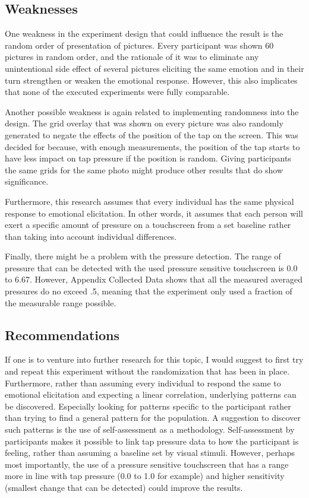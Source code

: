 \documentclass{sigchi}
\begin{document}
\subsection{Weaknesses}
One weakness in the experiment design that could influence the result is the random order of presentation of pictures. Every participant was shown 60 pictures in random order, and the rationale of it was to eliminate any unintentional side effect of several pictures eliciting the same emotion and in their turn strengthen or weaken the emotional response. However, this also implicates that none of the executed experiments were fully comparable.

Another possible weakness is again related to implementing randomness into the design. The grid overlay that was shown on every picture was also randomly generated to negate the effects of the position of the tap on the screen. This was decided for because, with enough measurements, the position of the tap starts to have less impact on tap pressure if the position is random. Giving participants the same grids for the same photo might produce other results that do show significance.

Furthermore, this research assumes that every individual has the same physical response to emotional elicitation. In other words, it assumes that each person will exert a specific amount of pressure on a touchscreen from a set baseline rather than taking into account individual differences.

Finally, there might be a problem with the pressure detection. The range of pressure that can be detected with the used pressure sensitive touchscreen is 0.0 to 6.67. However, Appendix Collected Data shows that all the measured averaged pressures do no exceed .5, meaning that the experiment only used a fraction of the measurable range possible.

\subsection{Recommendations} %
\label{sub:recommendations}
If one is to venture into further research for this topic, I would suggest to first try and repeat this experiment without the randomization that has been in place. Furthermore, rather than assuming every individual to respond the same to emotional elicitation and expecting a linear correlation, underlying patterns can be discovered. Especially looking for patterns specific to the participant rather than trying to find a general pattern for the population. A suggestion to discover such patterns is the use of self-assessment as a methodology. Self-assessment by participants makes it possible to link tap pressure data to how the participant is feeling, rather than assuming a baseline set by visual stimuli. However, perhaps most importantly, the use of a pressure sensitive touchscreen that has a range more in line with tap pressure (0.0 to 1.0 for example) and higher sensitivity (smallest change that can be detected) could improve the results.
\end{document}
